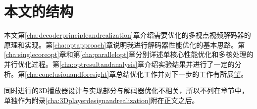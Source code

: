 \section{本文的结构}
\label{sec:thesisstructure}

本文第\ref{cha:decoderprincipleandrealization}章介绍需要优化的多视点视频解码器的原理和实现。第\ref{cha:optapproach}章说明我进行解码器性能优化的基本思路。第\ref{cha:singlecoreopt}章和第\ref{cha:parallelopt}章分别详述单核心性能优化和多核处理的并行优化过程。第\ref{cha:optresultandanalysis}章介绍实验结果并进行了一定的分析。第\ref{cha:conclusionandforesight}章总结优化工作并对下一步的工作有所展望。

同时进行的3D播放器设计与实现部分与解码器优化不相关，所以不列在章节中，单独作为附录\ref{cha:3Dplayerdesignandrealization}附在正文之后。